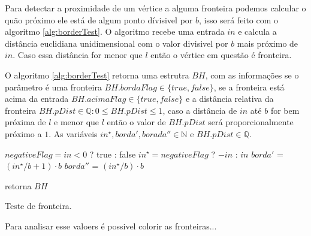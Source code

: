 Para detectar a proximidade de um vértice a alguma fronteira podemos calcular o 
quão próximo ele está de algum ponto dívisivel por $b$, isso será feito com 
o algoritmo \ref{alg:borderTest}. O algoritmo recebe uma entrada $in$ e calcula
a distância euclidiana unidimensional com o valor divisivel por $b$ mais próximo 
de $in$. Caso essa distância for menor que $l$ então o vértice em questão é 
fronteira.

O algoritmo \ref{alg:borderTest} retorna uma estrutra $BH$, com as informações
se o parâmetro é uma fronteira $BH.bordaFlag \in \{true, false\}$, se a fronteira 
está acima da entrada $BH.acimaFlag \in \{true, false\}$ e a distância relativa 
da fronteira $BH.pDist \in \mathbb{Q}: 0 \leq BH.pDist \leq 1$, caso a distância de $in$ até $b$ for bem 
próxima de $l$ e menor que $l$ então o valor de $BH.pDist$ será proporcionalmente
próximo a $1$. As variáveis
$in^{\star}, borda', borada'' \in \mathbb{N}$ e $BH.pDist \in \mathbb{Q}$.

\begin{algorithm}[H]\label{alg:borderTest}%
    $negativeFlag = in < 0$ ? true : false\;
    $in^{\star} = negativeFlag$ ? $-in$ : $in$\;
    $borda'$ = $(in^{\star}/b +1) \cdot b$\;
    $borda''$ = $(in^{\star}/b) \cdot b$\;
    
    retorna $BH$\;
    \caption{Teste de fronteira.}
\end{algorithm}

Para analisar esse valoers é possivel colorir as fronteiras...

